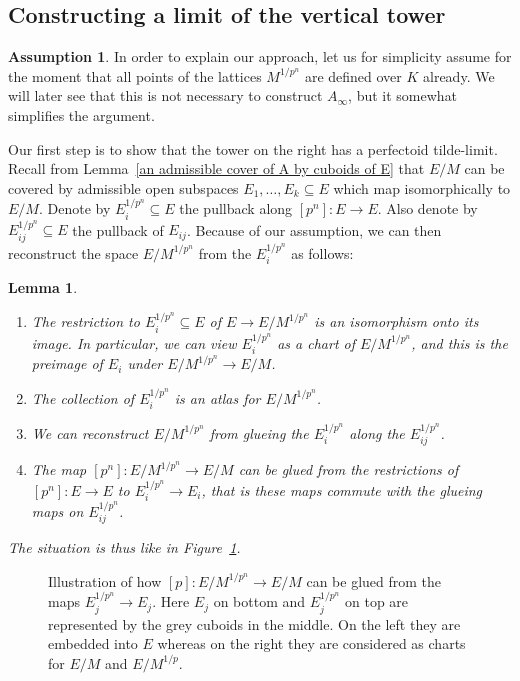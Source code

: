 \documentclass[11pt,oneside]{amsart}
\newtheorem{lemma}[theorem]{Lemma}
\theoremstyle{definition}
\newtheorem{assumption}[theorem]{Assumption}
\theoremstyle{remark}
\begin{document}
		\subsection{Constructing a limit of the vertical tower}
		\begin{assumption}\label{assumption that points of D_n are defined over K}
		In order to explain our approach, let us for simplicity assume for the moment that all points of the lattices $M^{1/p^n}$ are defined over $K$ already. We will later see that this is not necessary to construct $A_\infty$, but it somewhat simplifies the argument.
		\end{assumption}
		
		Our first step is to show that the tower on the right has a perfectoid tilde-limit.
		Recall from Lemma~\ref{an admissible cover of A by cuboids of E} that $E/M$ can be covered by admissible open subspaces $E_1,\dots,E_k\subseteq E$ which map isomorphically to $E/M$. Denote by $E_i^{1/p^n}\subseteq E$ the pullback along $[p^n]:E\rightarrow E$. Also denote by $E_{ij}^{1/p^n}\subseteq E$ the pullback of $E_{ij}$. Because of our assumption, we can then reconstruct the space $E/M^{1/p^n}$ from the $E_i^{1/p^n}$ as follows:
		\begin{lemma}\label{compatible cuboid charts for the tower over E/M}
			\leavevmode
			\begin{enumerate}
		\item The restriction to $E_{i}^{1/p^n}\subseteq E$ of $E\rightarrow E/M^{1/p^n}$ is an isomorphism onto its image. In particular, we can view $E_{i}^{1/p^n}$ as a chart of $E/M^{1/p^n}$, and this is the preimage of $E_i$ under $E/M^{1/p^n}\rightarrow E/M$.
		\item The collection of  $E_{i}^{1/p^n}$ is an atlas for  $E/M^{1/p^n}$. 
		\item We can reconstruct $E/M^{1/p^n}$ from glueing the $E_{i}^{1/p^n}$ along the $E_{ij}^{1/p^n}$.
		\item The map $[p^n]:E/M^{1/p^n}\rightarrow E/M$ can be glued from the restrictions of $[p^n]:E\rightarrow E$ to $E_{i}^{1/p^n}\rightarrow E_{i}$, that is these maps commute with the glueing maps on $E_{ij}^{1/p^n}$.
		\end{enumerate}
		The situation is thus like in Figure~\ref{transform-glue-cover-tikzpicture}.
		\end{lemma}
			\begin{figure}
				
				\caption{Illustration of how $[p]:E/M^{1/p^n}\rightarrow E/M$ can be glued from the maps $E_j^{1/p^n}\rightarrow E_j$. Here $E_j$ on bottom and $E_j^{1/p^n}$ on top are represented by the grey cuboids in the middle. On the left they are embedded into $E$ whereas on the right they are considered as charts for $E/M$ and $E/M^{1/p}$.}
				\label{transform-glue-cover-tikzpicture}
			\end{figure}
\end{document}

